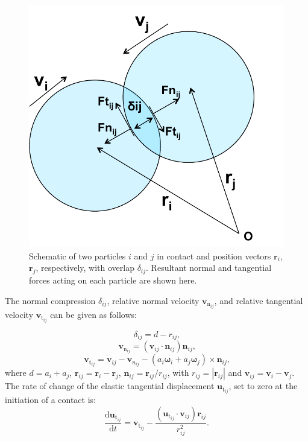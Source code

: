 \documentclass[11pt,a4paper,openright]{article}
\begin{document}
 \begin{figure}[!htb]
\begin{center}
  \includegraphics[width=0.4\columnwidth]{Figs/contactingpart.pdf}
\caption{Schematic of two particles $i$ and $j$ in contact and position vectors $\mathbf{r}_i$, $\mathbf{r}_j$, respectively, with overlap $\delta_{ij}$. Resultant normal and tangential forces acting on each particle are shown here.}
\label{fig:chp2a1}       %
\end{center}
\end{figure}  

The normal compression $\delta_{ij}$, relative normal velocity $\mathbf{v}_{\mathrm{n}_{ij}}$, and relative tangential velocity $\mathbf{v}_{\mathrm{t}_{ij}}$ can be given as follows:

\begin{equation}
		\delta_{ij}=d - r_{ij}\text{,}
\end{equation}
\begin{equation}
		\mathbf{v}_{\mathrm{n}_{ij}}=(\mathbf{v}_{ij}\cdot \mathbf{n}_{ij})\mathbf{n}_{ij}\text{,}
\end{equation}
\begin{equation}
\mathbf{v}_{\mathrm{t}_{ij}}=\mathbf{v}_{ij} - \mathbf{v}_{n_{ij}} -(a_i\bm{\omega}_i + a_j\bm{\omega}_j)\times \mathbf{n}_{ij}\text{,}
\end{equation}
	where $d = a_i + a_j$, $\mathbf{r}_{ij}= \mathbf{r}_i -
        \mathbf{r}_j$, $\mathbf{n}_{ij} = \mathbf{r}_{ij}/r_{ij}$,
        with $r_{ij} = |{\mathbf{r}_{ij}}|$ and $\mathbf{v}_{ij} =
        \mathbf{v}_i - \mathbf{v}_j$. The rate of change of the
		elastic tangential displacement $\mathbf{u}_{\mathrm{t}_{ij}}$, set to
        zero at the initiation of a contact is:
	\begin{equation}
		\label{eqn-ut}
		\frac{\mathrm{d}\mathbf{u}_{\mathrm{t}_{ij}}}{\mathrm{d}t} = \mathbf{v}_{\mathrm{t}_{ij}}
		- \frac{(\mathbf{u}_{\mathrm{t}_{ij}}\cdot\mathbf{v}_{ij})\mathbf{r}_{ij}}{r^2_{ij}}\text{.}
	\end{equation}
	
\end{document}
